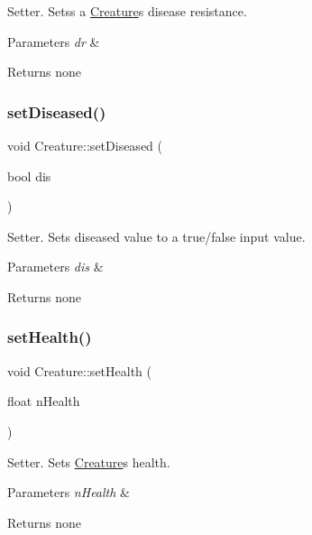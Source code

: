 Setter. Setss a \hyperlink{class_creature}{Creature}\textquotesingle{}s disease resistance. 
\begin{DoxyParams}{Parameters}
{\em dr} & \\
\hline
\end{DoxyParams}
\begin{DoxyReturn}{Returns}
none 
\end{DoxyReturn}
\mbox{\label{class_creature_a87418faed3520d70b5e79454c51d9d6b}} 
\subsubsection{\texorpdfstring{set\+Diseased()}{setDiseased()}}
{\footnotesize\ttfamily void Creature\+::set\+Diseased (\begin{DoxyParamCaption}\item[{bool}]{dis }\end{DoxyParamCaption})}

Setter. Sets diseased value to a true/false input value. 
\begin{DoxyParams}{Parameters}
{\em dis} & \\
\hline
\end{DoxyParams}
\begin{DoxyReturn}{Returns}
none 
\end{DoxyReturn}
\mbox{\label{class_creature_a470452d2a72844d841475e2fa1411b87}} 
\subsubsection{\texorpdfstring{set\+Health()}{setHealth()}}
{\footnotesize\ttfamily void Creature\+::set\+Health (\begin{DoxyParamCaption}\item[{float}]{n\+Health }\end{DoxyParamCaption})}

Setter. Sets \hyperlink{class_creature}{Creature}\textquotesingle{}s health. 
\begin{DoxyParams}{Parameters}
{\em n\+Health} & \\
\hline
\end{DoxyParams}
\begin{DoxyReturn}{Returns}
none 
\end{DoxyReturn}
\mbox{\label{class_creature_ac54280109cd668ca679189c83cf9318c}} 
